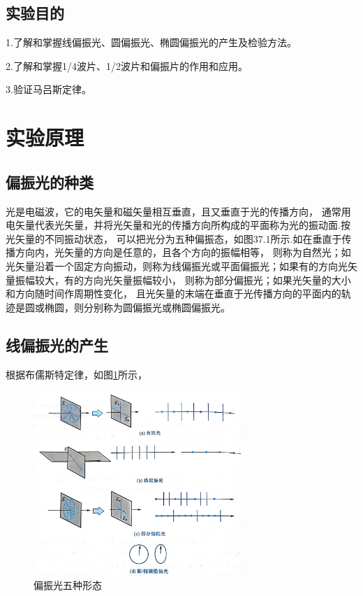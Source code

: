 \documentclass{ctexart}
\begin{document}
  \subsection{实验目的}
  1.\quad 了解和掌握线偏振光、圆偏振光、椭圆偏振光的产生及检验方法。

  2.\quad 了解和掌握1/4波片、1/2波片和偏振片的作用和应用。

  3.\quad 验证马吕斯定律。

\section{实验原理}
  \subsection{偏振光的种类}
  光是电磁波，它的电矢量和磁矢量相互垂直，且又垂直于光的传播方向，
  通常用电矢量代表光矢量，并将光矢量和光的传播方向所构成的平面称为光的振动面.按光矢量的不同振动状态，
  可以把光分为五种偏振态，如图37.1所示.如在垂直于传播方向内，光矢量的方向是任意的，且各个方向的振幅相等，
  则称为自然光；如光矢量沿着一个固定方向振动，则称为线偏振光或平面偏振光；如果有的方向光矢量振幅较大，有的方向光矢量振幅较小，
  则称为部分偏振光；如果光矢量的大小和方向随时间作周期性变化，
  且光矢量的末端在垂直于光传播方向的平面内的轨迹是圆或椭圆，则分别称为圆偏振光或椭圆偏振光。

  \subsection{线偏振光的产生}
  根据布儒斯特定律，如图\ref{pianzhentai}所示，

  \begin{figure}[H]\label{pianzhentai}
    \centering
    \includegraphics[width=0.7\textwidth,height=0.4\textheight]{pianzhentai.jpg}
    \caption{偏振光五种形态}
  \end{figure}
  
\end{document}
